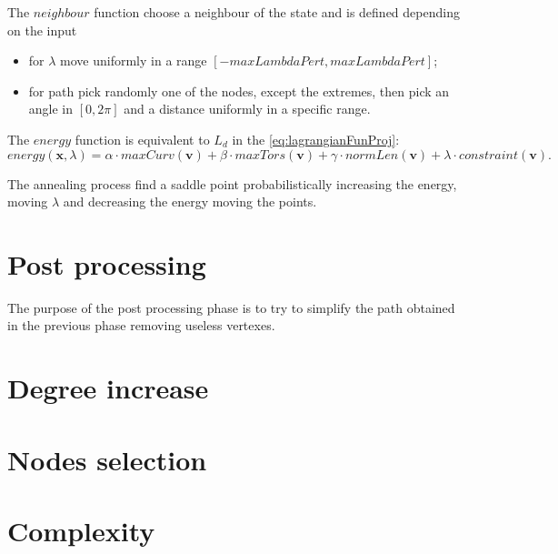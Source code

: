 \documentclass[dissertation.tex]{subfiles}
\begin{document}
The $neighbour$ function choose a neighbour of the state and is
defined depending on the input
\begin{itemize}
  \item for $\lambda$ move uniformly in a range $[-maxLambdaPert, maxLambdaPert]$;
  \item for path pick randomly one of the nodes, except the extremes,
    then pick an angle in $[0,2\pi]$ and a distance
    uniformly in a specific range.
\end{itemize}

The $energy$ function is equivalent to $L_d$ in the
\cref{eq:lagrangianFunProj}:
$$energy(\mathbf{x},\lambda)=\alpha\cdot maxCurv(\mathbf{v})+\beta\cdot
    maxTors(\mathbf{v})+\gamma\cdot normLen(\mathbf{v})+\lambda\cdot constraint(\mathbf{v}).$$

The annealing process
find a saddle point probabilistically increasing the energy, moving
$\lambda$ and 
decreasing the energy moving the points.


\section{Post processing}\label{sec:postPro}
The purpose of the post processing phase is to try to simplify the
path obtained in the previous phase removing useless vertexes.
\section{Degree increase}\label{sec:degreeInc}
\section{Nodes selection}\label{sec:nodeSel}
\section{Complexity}
\end{document}
